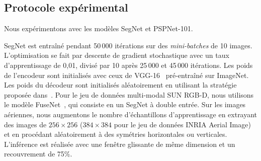 
\subsection{Protocole expérimental}

Nous expérimentons avec les modèles SegNet et PSPNet-101.

SegNet est entraîné pendant 50\,000 itérations sur des \emph{mini-batches} de 10 images. L'optimisation se fait par descente de gradient stochastique avec un taux d'apprentissage de 0,01, divisé par 10 après 25\,000 et 45\,000 itérations. Les poids de l'encodeur sont initialisés avec ceux de VGG-16~\cite{simonyan_very_2014} pré-entraîné sur ImageNet. Les poids du décodeur sont initialisés aléatoirement en utilisant la stratégie proposée dans~\cite{he_delving_2015}.
Pour le jeu de données multi-modal SUN RGB-D, nous utilisons le modèle FuseNet~\cite{hazirbas_fusenet:_2016}, qui consiste en un SegNet à double entrée.
Sur les images aériennes, nous augmentons le nombre d'échantillons d'apprentissage en extrayant des images de $256\times256$ ($384\times384$ pour le jeu de données INRIA Aerial Image) et en procédant aléatoirement à des symétries horizontales ou verticales. L'inférence est réalisée avec une fenêtre glissante de même dimension et un recouvrement de 75\%.

